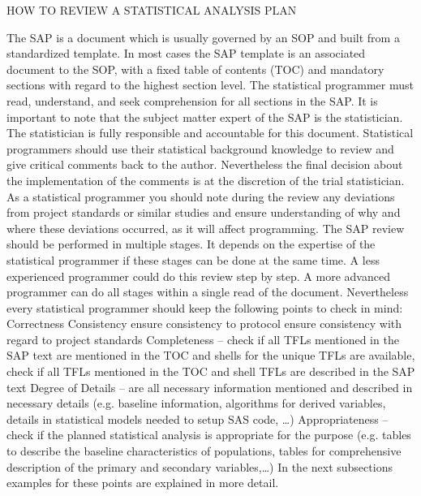 HOW TO REVIEW A STATISTICAL ANALYSIS PLAN

The SAP is a document which is usually governed by an SOP and built from a standardized template. In most cases the SAP template is an associated document to the SOP, with a fixed table of contents (TOC) and mandatory sections with regard to the highest section level.
The statistical programmer must read, understand, and seek comprehension for all sections in the SAP. It is important to note that the subject matter expert of the SAP is the statistician. The statistician is fully responsible and accountable for this document. Statistical programmers should use their statistical background knowledge to review and give critical comments back to the author. Nevertheless the final decision about the implementation of the comments is at the discretion of the trial statistician.
As a statistical programmer you should note during the review any deviations from project standards or similar studies and ensure understanding of why and where these deviations occurred, as it will affect programming.
The SAP review should be performed in multiple stages. It depends on the expertise of the statistical programmer if these stages can be done at the same time. A less experienced programmer could do this review step by step. A more advanced programmer can do all stages within a single read of the document. Nevertheless every statistical programmer should keep the following points to check in mind:
Correctness
Consistency
ensure consistency to protocol
ensure consistency with regard to project standards
Completeness – check if all TFLs mentioned in the SAP text are mentioned in the TOC and shells for the unique TFLs are available, check if all TFLs mentioned in the TOC and shell TFLs are described in the SAP text
Degree of Details – are all necessary information mentioned and described in necessary details (e.g. baseline information, algorithms for derived variables, details in statistical models needed to setup SAS code, …)
Appropriateness – check if the planned statistical analysis is appropriate for the purpose (e.g. tables to describe the baseline characteristics of populations, tables for comprehensive description of the primary and secondary variables,…)
In the next subsections examples for these points are explained in more detail.

